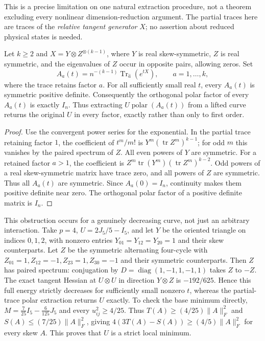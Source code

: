 This is a precise limitation on one natural extraction procedure, not
a theorem excluding every nonlinear dimension-reduction argument.
The partial traces here are traces of the \emph{relative tangent
generator} $X$; no assertion about reduced physical states is needed.

\begin{proposition}
 Let $k\ge2$ and $X=Y\otimes Z^{\otimes(k-1)}$, where $Y$ is real skew-symmetric,
$Z$ is real symmetric, and the eigenvalues of $Z$ occur in opposite
pairs, allowing zeros. Set
\[
 A_a(t)=n^{-(k-1)}\operatorname{Tr}_{\widehat a}(e^{tX}),
 \qquad a=1,\ldots,k,
\]
where the trace retains factor $a$. For all sufficiently small real
$t$, every $A_a(t)$ is symmetric positive definite. Consequently the
orthogonal polar factor of every $A_a(t)$ is exactly $I_n$.
Thus extracting $U\operatorname{polar}(A_a(t))$ from a lifted curve
returns the original $U$ in every factor, exactly rather than only
to first order.
\end{proposition}
\begin{proof}
Use the convergent power series for the exponential. In the partial
trace retaining factor $1$, the coefficient of $t^m/m!$ is
$Y^m(\operatorname{tr}Z^m)^{k-1}$; for odd $m$ this vanishes by the
paired spectrum of $Z$. All even powers of $Y$ are symmetric.
For a retained factor $a>1$, the coefficient is
$Z^m\operatorname{tr}(Y^m)(\operatorname{tr}Z^m)^{k-2}$.
Odd powers of a real skew-symmetric matrix have trace zero, and
all powers of $Z$ are symmetric. Thus all $A_a(t)$ are symmetric.
Since $A_a(0)=I_n$, continuity makes them positive definite near zero.
The orthogonal polar factor of a positive definite matrix is $I_n$.
\end{proof}

This obstruction occurs for a genuinely decreasing curve, not just an
arbitrary interaction. Take $p=4$, $U=2J_5/5-I_5$, and let $Y$ be the
oriented triangle on indices $0,1,2$, with nonzero entries
$Y_{01}=Y_{12}=Y_{20}=1$ and their skew counterparts. Let $Z$ be the
symmetric alternating four-cycle with
$Z_{01}=1,Z_{12}=-1,Z_{23}=1,Z_{30}=-1$ and their symmetric counterparts.
Then $Z$ has paired spectrum: conjugation by
$D=\operatorname{diag}(1,-1,1,-1,1)$ takes $Z$ to $-Z$.
The exact tangent Hessian at $U\otimes U$ in direction $Y\otimes Z$
is $-192/625$. Hence this full energy strictly decreases for sufficiently
small nonzero $t$, whereas the partial-trace polar extraction returns
$U$ exactly. To check the base minimum directly,
$M=\frac7{25}I_5-\frac6{125}J_5$ and every $u_{ij}^2\ge4/25$.
Thus $T(A)\ge(4/25)\|A\|_F^2$ and
$S(A)\le(7/25)\|A\|_F^2$, giving
$4(3T(A)-S(A))\ge(4/5)\|A\|_F^2$ for every skew $A$.
This proves that $U$ is a strict local minimum.

